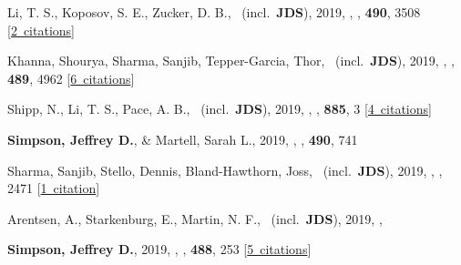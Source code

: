 \item[{\color{numcolor}\scriptsize35}] Li, T. S., Koposov, S. E., Zucker, D. B., \etal\ (incl.\ \textbf{JDS}), 2019, , \mnras, \textbf{490}, 3508 [\href{https://ui.adsabs.harvard.edu/#abs/2019MNRAS.490.3508L}{2~citations}]

\item[{\color{numcolor}\scriptsize34}] Khanna, Shourya, Sharma, Sanjib, Tepper-Garcia, Thor, \etal\ (incl.\ \textbf{JDS}), 2019, , \mnras, \textbf{489}, 4962 [\href{https://ui.adsabs.harvard.edu/#abs/2019MNRAS.489.4962K}{6~citations}]

\item[{\color{numcolor}\scriptsize33}] Shipp, N., Li, T. S., Pace, A. B., \etal\ (incl.\ \textbf{JDS}), 2019, , \apj, \textbf{885}, 3 [\href{https://ui.adsabs.harvard.edu/#abs/2019ApJ...885....3S}{4~citations}]

\item[{\color{numcolor}\scriptsize32}] \textbf{Simpson, Jeffrey D.}, \& Martell, Sarah L., 2019, , \mnras, \textbf{490}, 741

\item[{\color{numcolor}\scriptsize31}] Sharma, Sanjib, Stello, Dennis, Bland-Hawthorn, Joss, \etal\ (incl.\ \textbf{JDS}), 2019, , \mnras, 2471 [\href{https://ui.adsabs.harvard.edu/#abs/2019MNRAS.tmp.2471S}{1~citation}]

\item[{\color{numcolor}\scriptsize30}] Arentsen, A., Starkenburg, E., Martin, N. F., \etal\ (incl.\ \textbf{JDS}), 2019, , \mnras

\item[{\color{numcolor}\scriptsize29}] \textbf{Simpson, Jeffrey D.}, 2019, , \mnras, \textbf{488}, 253 [\href{https://ui.adsabs.harvard.edu/#abs/2019MNRAS.488..253S}{5~citations}]

